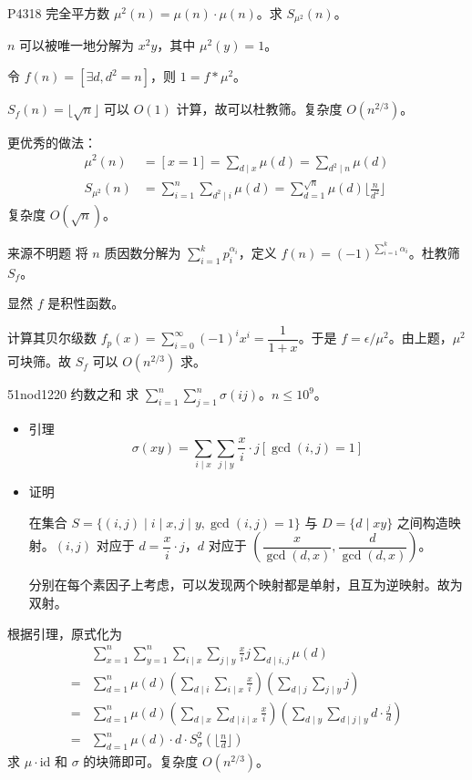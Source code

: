 \documentclass [hyperref={bookmarksdepth=4}, aspectratio=169] {beamer}
\theoremstyle {fy}
\begin{document}
\begin{frame}{P4318 完全平方数}
$\mu^2(n)=\mu(n)\cdot\mu(n)$。求 $S_{\mu^2}(n)$。

$n$ 可以被唯一地分解为 $x^2y$，其中 $\mu^2(y)=1$。

令 $f(n)=[\exists d,d^2=n]$，则 $1=f*\mu^2$。

$S_f(n)=\lfloor \sqrt n\rfloor$ 可以 $O(1)$ 计算，故可以杜教筛。复杂度 $O(n^{2/3})$。

更优秀的做法：
$$
\begin{aligned}
\mu^2(n)&=[x=1]=\sum_{d\mid x}\mu(d)=\sum_{d^2\mid n}\mu(d)\\
S_{\mu^2}(n)&=\sum_{i=1}^n\sum_{d^2\mid i}\mu(d)=\sum_{d=1}^{\sqrt{n}}\mu(d)\lfloor\frac{n}{d^2}\rfloor
\end{aligned}
$$
复杂度 $O(\sqrt n)$。
\end{frame}

\begin{frame}{来源不明题}
将 $n$ 质因数分解为 $\sum\limits_{i=1}^kp_i^{\alpha_i}$，定义 $f(n)=(-1)^{\sum_{i=1}^k\alpha_i}$。杜教筛 $S_f$。

显然 $f$ 是积性函数。

计算其贝尔级数 $f_p(x)=\sum\limits_{i=0}^{\infty}(-1)^ix^i=\dfrac{1}{1+x}$。于是 $f=\epsilon/\mu^2$。由上题，$\mu^2$ 可块筛。故 $S_f$ 可以 $O(n^{2/3})$ 求。
\end{frame}

\begin{frame}{51nod1220 约数之和}
求 $\sum\limits_{i=1}^n\sum\limits_{j=1}^n\sigma(ij)$。$n\le 10^9$。

\begin{itemize}
    \item 引理
  $$
  \sigma(xy)=\sum_{i\mid x}\sum_{j\mid y}\frac{x}{i}\cdot j[\gcd(i,j)=1]
  $$

    \item 证明

  在集合 $S=\{(i,j)\mid i\mid x,j\mid y,\gcd(i,j)=1 \}$ 与 $D=\{d\mid xy\}$ 之间构造映射。$(i,j)$ 对应于 $d=\dfrac{x}{i}\cdot j$，$d$ 对应于 $(\dfrac{x}{\gcd(d,x)},\dfrac{d}{\gcd(d,x)})$。

  分别在每个素因子上考虑，可以发现两个映射都是单射，且互为逆映射。故为双射。
\end{itemize}

根据引理，原式化为
$$
\begin{aligned}
&\sum_{x=1}^n\sum_{y=1}^n\sum_{i\mid x}\sum_{j\mid y}\frac{x}{i}j\sum_{d\mid i,j}\mu(d)\\
=&\sum_{d=1}^n\mu(d)(\sum_{d\mid i}\sum_{i\mid x}\frac{x}{i})(\sum_{d\mid j}\sum_{j\mid y}j)\\
=&\sum_{d=1}^n\mu(d)(\sum_{d\mid x}\sum_{d\mid i\mid x}\frac{x}{i})(\sum_{d\mid y}\sum_{d\mid j\mid y}d\cdot\frac{j}{d})\\
=&\sum_{d=1}^n\mu(d)\cdot d\cdot S_{\sigma}^2(\lfloor\frac{n}{d}\rfloor)
\end{aligned}
$$
求 $\mu\cdot \text{id}$ 和 $\sigma$ 的块筛即可。复杂度 $O(n^{2/3})$。
\end{frame}
\end{document}
